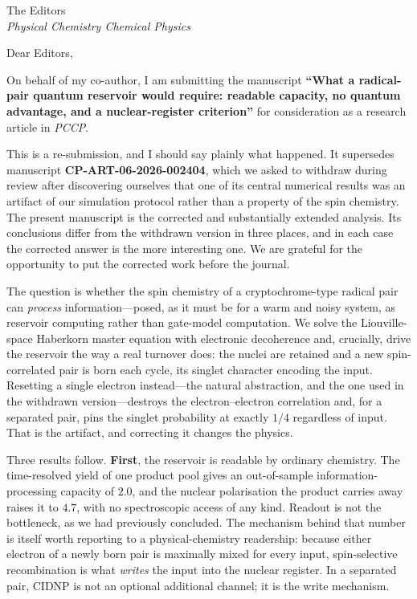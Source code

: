 \documentclass[11pt]{letter}
\begin{document}
\begin{letter}{The Editors\\ \textit{Physical Chemistry Chemical Physics}}

\opening{Dear Editors,}

On behalf of my co-author, I am submitting the manuscript \textbf{``What a
radical-pair quantum reservoir would require: readable capacity, no quantum
advantage, and a nuclear-register criterion''} for consideration as a research
article in \textit{PCCP}.

This is a re-submission, and I should say plainly what happened. It supersedes
manuscript \textbf{CP-ART-06-2026-002404}, which we asked to withdraw during review
after discovering ourselves that one of its central numerical results was an
artifact of our simulation protocol rather than a property of the spin chemistry.
The present manuscript is the corrected and substantially extended analysis. Its
conclusions differ from the withdrawn version in three places, and in each case the
corrected answer is the more interesting one. We are grateful for the opportunity to
put the corrected work before the journal.

The question is whether the spin chemistry of a cryptochrome-type radical pair can
\emph{process} information---posed, as it must be for a warm and noisy system, as
reservoir computing rather than gate-model computation. We solve the Liouville-space
Haberkorn master equation with electronic decoherence and, crucially, drive the
reservoir the way a real turnover does: the nuclei are retained and a new
spin-correlated pair is born each cycle, its singlet character encoding the input.
Resetting a single electron instead---the natural abstraction, and the one used in
the withdrawn version---destroys the electron--electron correlation and, for a
separated pair, pins the singlet probability at exactly $1/4$ regardless of input.
That is the artifact, and correcting it changes the physics.

Three results follow. \textbf{First}, the reservoir is readable by ordinary
chemistry. The time-resolved yield of one product pool gives an out-of-sample
information-processing capacity of $2.0$, and the nuclear polarisation the product
carries away raises it to $4.7$, with no spectroscopic access of any kind. Readout
is not the bottleneck, as we had previously concluded. The mechanism behind that
number is itself worth reporting to a physical-chemistry readership: because either
electron of a newly born pair is maximally mixed for every input, spin-selective
recombination is what \emph{writes} the input into the nuclear register. In a
separated pair, CIDNP is not an optional additional channel; it is the write
mechanism.


\end{letter}
\end{document}
